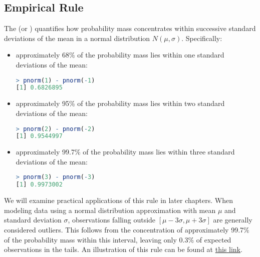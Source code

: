 \subsection{Empirical Rule}

The  (or ) quantifies how probability mass concentrates within successive standard deviations of the mean in a normal distribution \( N(\mu, \sigma) \).
Specifically:
\begin{itemize}
    \item approximately 68\% of the probability mass lies within one standard deviations of the mean:
    \begin{lstlisting}[language=R]
> pnorm(1) - pnorm(-1)
[1] 0.6826895      
    \end{lstlisting}
    \item approximately 95\% of the probability mass lies within two standard deviations of the mean:
    \begin{lstlisting}[language=R]
> pnorm(2) - pnorm(-2)
[1] 0.9544997
    \end{lstlisting}
    \item approximately 99.7\% of the probability mass lies within three standard deviations of the mean:
    \begin{lstlisting}[language=R]
> pnorm(3) - pnorm(-3)
[1] 0.9973002
    \end{lstlisting}
\end{itemize}
We will examine practical applications of this rule in later chapters.
When modeling data using a normal distribution approximation with mean \( \mu \) and standard deviation \( \sigma \),
observations falling outside \( [\mu - 3\sigma, \mu + 3\sigma] \) are generally considered outliers.
This follows from the concentration of approximately 99.7\% of the probability mass within this interval,
leaving only 0.3\% of expected observations in the tails.
An illustration of this rule can be found at \href{https://andymath.com/normal-distribution-empirical-rule/}{this link}.


